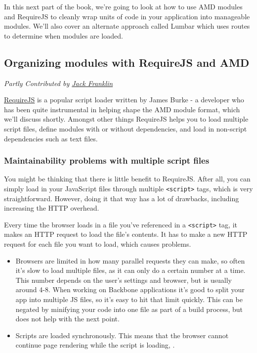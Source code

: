 \documentclass[9pt]{book}
\begin{document}
In this next part of the book, we're going to look at how to use AMD
modules and RequireJS to cleanly wrap units of code in your application
into manageable modules. We'll also cover an alternate approach called
Lumbar which uses routes to determine when modules are loaded.

\subsection{Organizing modules with RequireJS and
AMD}\label{organizing-modules-with-requirejs-and-amd}

\emph{Partly Contributed by \href{https://github.com/jackfranklin}{Jack
Franklin}}

\href{http://requirejs.org}{RequireJS} is a popular script loader
written by James Burke - a developer who has been quite instrumental in
helping shape the AMD module format, which we'll discuss shortly.
Amongst other things RequireJS helps you to load multiple script files,
define modules with or without dependencies, and load in non-script
dependencies such as text files.

\subsubsection{Maintainability problems with multiple script
files}\label{maintainability-problems-with-multiple-script-files}

You might be thinking that there is little benefit to RequireJS. After
all, you can simply load in your JavaScript files through multiple
\texttt{\textless{}script\textgreater{}} tags, which is very
straightforward. However, doing it that way has a lot of drawbacks,
including increasing the HTTP overhead.

Every time the browser loads in a file you've referenced in a
\texttt{\textless{}script\textgreater{}} tag, it makes an HTTP request
to load the file's contents. It has to make a new HTTP request for each
file you want to load, which causes problems.

\begin{itemize}
\itemsep1pt\parskip0pt
\item
  Browsers are limited in how many parallel requests they can make, so
  often it's slow to load multiple files, as it can only do a certain
  number at a time. This number depends on the user's settings and
  browser, but is usually around 4-8. When working on Backbone
  applications it's good to split your app into multiple JS files, so
  it's easy to hit that limit quickly. This can be negated by minifying
  your code into one file as part of a build process, but does not help
  with the next point.
\item
  Scripts are loaded synchronously. This means that the browser cannot
  continue page rendering while the script is loading, .
\end{itemize}
\end{document}
